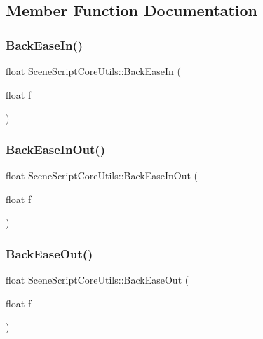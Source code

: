 \subsection{Member Function Documentation}
\hypertarget{class_scene_script_core_utils_aa5a2cfe6126eda769cc5dde5555cf280}{}\label{class_scene_script_core_utils_aa5a2cfe6126eda769cc5dde5555cf280} 
\subsubsection{\texorpdfstring{Back\+Ease\+In()}{BackEaseIn()}}
{\footnotesize\ttfamily float Scene\+Script\+Core\+Utils\+::\+Back\+Ease\+In (\begin{DoxyParamCaption}\item[{float}]{f }\end{DoxyParamCaption})}

\hypertarget{class_scene_script_core_utils_a607e62bb8adae205b5e5c79fb5555272}{}\label{class_scene_script_core_utils_a607e62bb8adae205b5e5c79fb5555272} 
\subsubsection{\texorpdfstring{Back\+Ease\+In\+Out()}{BackEaseInOut()}}
{\footnotesize\ttfamily float Scene\+Script\+Core\+Utils\+::\+Back\+Ease\+In\+Out (\begin{DoxyParamCaption}\item[{float}]{f }\end{DoxyParamCaption})}

\hypertarget{class_scene_script_core_utils_ac489b26dc16254abeda9018a0f7a7bac}{}\label{class_scene_script_core_utils_ac489b26dc16254abeda9018a0f7a7bac} 
\subsubsection{\texorpdfstring{Back\+Ease\+Out()}{BackEaseOut()}}
{\footnotesize\ttfamily float Scene\+Script\+Core\+Utils\+::\+Back\+Ease\+Out (\begin{DoxyParamCaption}\item[{float}]{f }\end{DoxyParamCaption})}

